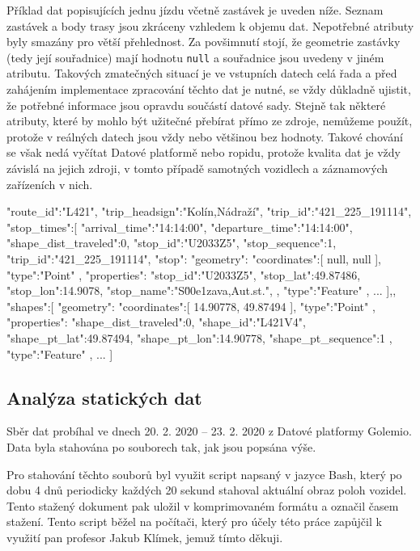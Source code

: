 \bigbreak

Příklad dat popisujících jednu jízdu včetně zastávek je uveden níže. Seznam zastávek a body trasy jsou zkráceny vzhledem k objemu dat. Nepotřebné atributy byly smazány pro větší přehlednost. Za povšimnutí stojí, že geometrie zastávky (tedy její souřadnice) mají hodnotu \verb-null- a souřadnice jsou uvedeny v jiném atributu. Takových zmatečných situací je ve vstupních datech celá řada a před zahájením implementace zpracování těchto dat je nutné, se vždy důkladně ujistit, že potřebné informace jsou opravdu součástí datové sady. Stejně tak některé atributy, které by mohlo být užitečné přebírat přímo ze zdroje, nemůžeme použít, protože v reálných datech jsou vždy nebo většinou bez hodnoty. Takové chování se však nedá vyčítat Datové platformě nebo \gls{ropid}u, protože kvalita dat je vždy závislá na jejich zdroji, v tomto případě samotných vozidlech a záznamových zařízeních v nich.

\begin{code}[frame=none]
"route_id":"L421",
"trip_headsign":"Kolín,Nádraží",
"trip_id":"421_225_191114",
"stop_times":[{
  "arrival_time":"14:14:00",
  "departure_time":"14:14:00",
  "shape_dist_traveled":0,
  "stop_id":"U2033Z5",
  "stop_sequence":1,
  "trip_id":"421_225_191114",
  "stop":{
    "geometry":{
      "coordinates":[
        null,
        null
      ],
      "type":"Point"
    },
    "properties":{
      "stop_id":"U2033Z5",
      "stop_lat":49.87486,
      "stop_lon":14.9078,
      "stop_name":"S\u00e1zava,Aut.st.",
    },
    "type":"Feature"
  },
  ...
],},
"shapes":[{
  "geometry":{
    "coordinates":[
      14.90778,
      49.87494
    ],
    "type":"Point"
  },
  "properties":{
    "shape_dist_traveled":0,
    "shape_id":"L421V4",
    "shape_pt_lat":49.87494,
    "shape_pt_lon":14.90778,
    "shape_pt_sequence":1
  },
  "type":"Feature"
},
...
]

\end{code}

\subsection{Analýza statických dat}

Sběr dat probíhal ve dnech 20. 2. 2020 -- 23. 2. 2020 z Datové platformy Golemio. Data byla stahována po souborech tak, jak jsou popsána výše.

\bigbreak

Pro stahování těchto souborů byl využit script napsaný v jazyce Bash, který po dobu 4 dnů periodicky každých 20 sekund stahoval aktuální obraz poloh vozidel. Tento stažený dokument pak uložil v komprimovaném formátu a označil časem stažení. Tento script běžel na počítači, který pro účely této práce zapůjčil k využití pan profesor Jakub Klímek, jemuž tímto děkuji.

